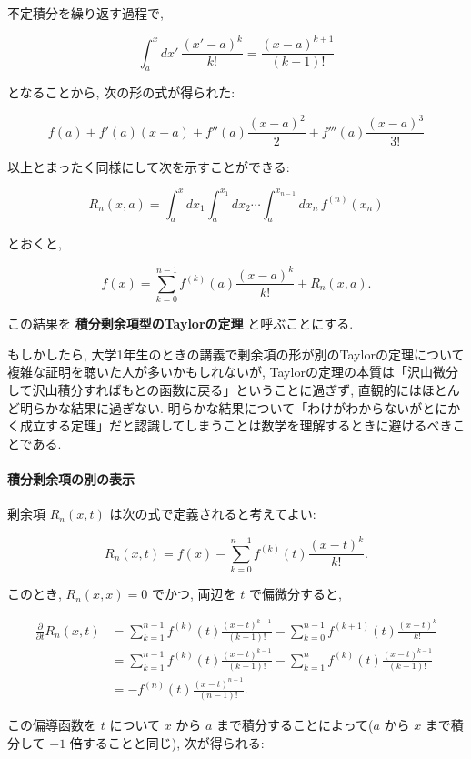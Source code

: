 \documentclass[
  letterpaper,
  DIV=11,
  numbers=noendperiod]{scrartcl}
\let\oldparagraph\paragraph
\renewcommand{\paragraph}[1]{\oldparagraph{#1}\mbox{}}
\begin{document}
不定積分を繰り返す過程で,

\[
\int_a^x dx'\,\frac{(x' - a)^k}{k!} =
\frac{(x - a)^{k+1}}{(k+1)!}
\]

となることから, 次の形の式が得られた:

\[
f(a) + f'(a)(x - a) + f''(a)\frac{(x - a)^2}{2} + f'''(a)\frac{(x - a)^3}{3!}
\]

以上とまったく同様にして次を示すことができる:

\[
R_n(x, a) = \int_a^x dx_1\int_a^{x_1}dx_2\cdots\int_a^{x_{n-1}}dx_n\, f^{(n)}(x_n)
\]

とおくと,

\[
f(x) = \sum_{k=0}^{n-1} f^{(k)}(a)\frac{(x-a)^k}{k!} + R_n(x,a).
\]

この結果を \textbf{積分剰余項型のTaylorの定理} と呼ぶことにする.

もしかしたら,
大学1年生のときの講義で剰余項の形が別のTaylorの定理について複雑な証明を聴いた人が多いかもしれないが,
Taylorの定理の本質は「沢山微分して沢山積分すればもとの函数に戻る」ということに過ぎず,
直観的にはほとんど明らかな結果に過ぎない.
明らかな結果について「わけがわからないがとにかく成立する定理」だと認識してしまうことは数学を理解するときに避けるべきことである.

\hypertarget{ux7a4dux5206ux5270ux4f59ux9805ux306eux5225ux306eux8868ux793a}{%
\paragraph{積分剰余項の別の表示}\label{ux7a4dux5206ux5270ux4f59ux9805ux306eux5225ux306eux8868ux793a}}

剰余項 \(R_n(x,t)\) は次の式で定義されると考えてよい:

\[
R_n(x,t) = f(x) - \sum_{k=0}^{n-1} f^{(k)}(t)\frac{(x-t)^k}{k!}.
\]

このとき, \(R_n(x,x)=0\) でかつ, 両辺を \(t\) で偏微分すると,

\[
\begin{aligned}
\frac{\partial}{\partial t}R_n(x,t) &=
\sum_{k=1}^{n-1} f^{(k)}(t)\frac{(x-t)^{k-1}}{(k-1)!} -
\sum_{k=0}^{n-1} f^{(k+1)}(t)\frac{(x-t)^k}{k!}
\\ &=
\sum_{k=1}^{n-1} f^{(k)}(t)\frac{(x-t)^{k-1}}{(k-1)!} -
\sum_{k=1}^{n} f^{(k)}(t)\frac{(x-t)^{k-1}}{(k-1)!}
\\ &= -
f^{(n)}(t)\frac{(x-t)^{n-1}}{(n-1)!}.
\end{aligned}
\]

この偏導函数を \(t\) について \(x\) から \(a\)
まで積分することによって(\(a\) から \(x\) まで積分して \(-1\)
倍することと同じ), 次が得られる:
\end{document}
